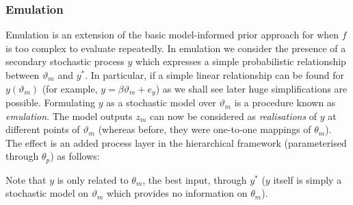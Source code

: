 \documentclass[10pt,a4paper]{article}
\begin{document}
\subsubsection*{Emulation}

Emulation is an extension of the basic model-informed prior approach for when $f$ is too complex to evaluate repeatedly. In emulation we consider the presence of a secondary stochastic process $y$ which expresses a simple probabilistic relationship between $\vartheta_m$ and $y^*$. In particular, if a simple linear relationship can be found for $y(\vartheta_m)$ (for example, $y = \beta\vartheta_m + e_y$) as we shall see later huge simplifications are possible. Formulating $y$ as a stochastic model over $\vartheta_m$ is a procedure known as \emph{emulation}. The model outputs $z_m$ can now be considered as \emph{realisations} of $y$ at different points of $\vartheta_m$ (whereas before, they were one-to-one mappings of $\theta_m$). The effect is an added process layer in the hierarchical framework (parameterised through $\theta_p$) as follows:

\begin{figure}[h!]
\centering
{}
\end{figure}

\noindent Note that $y$ is only related to $\theta_m$, the best input, through $y^*$ ($y$ itself is simply a stochastic model on $\vartheta_m$ which provides no information on $\theta_m$).
\end{document}

